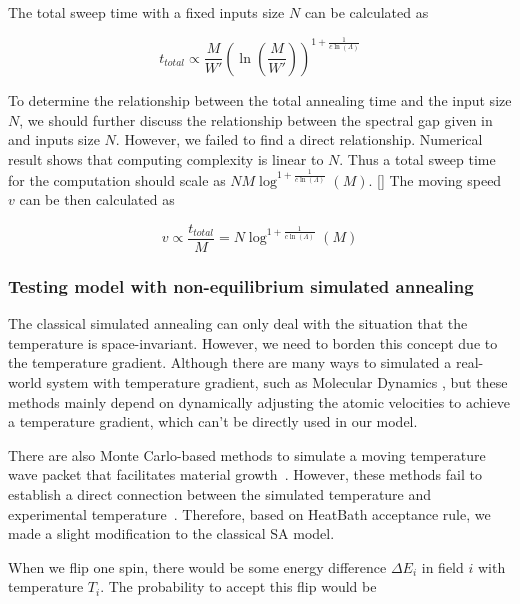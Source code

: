 \documentclass[twocolumn,superscriptaddress,english,showpacs,longbibliography]{revtex4-2}
\newcommand{\ym}[1]{[{\color{red}{YM: #1}}]}
\begin{document}
The total sweep time with a fixed inputs size $N$ can be calculated as 

\begin{equation}
    \label{eq:total-annealing-time}
    t_{total} \propto \frac{M}{W'}(\ln(\frac{M}{W'}))^{1+ \frac{1}{c\ln(\Lambda)}}
\end{equation}

To determine the relationship between the total annealing time and the input size $N$, we should
further discuss the relationship between the spectral gap given in   and inputs size $N$.
However, we failed to find a direct relationship.
Numerical result shows that computing complexity is linear to $N$. Thus a total sweep time
for the computation should scale as $NM\log^{1 + \frac{1}{c\ln(\Lambda)}}(M)$.
\ym{Please help me to think about how to evaluate the time complexity while $N$ increases.} 
The moving speed $v$ can be then calculated as

\begin{equation}
    \label{eq:moving-speed}
    v \propto \frac{t_{total}}{M} = N\log^{1 + \frac{1}{c\ln(\Lambda)}}(M)
\end{equation}

\subsubsection{Testing model with non-equilibrium simulated
annealing}\label{some-details-about-non-equilibrium-simulated-annealing}

The classical simulated annealing can only deal with the situation that
the temperature is space-invariant. However, we need to borden this concept
due to the temperature gradient. Although there are many ways to
simulated a real-world system with temperature gradient, such as
Molecular Dynamics \cite{Bai2015, Deng2006}, but
these methods mainly depend on dynamically adjusting the atomic
velocities to achieve a temperature gradient, which can't be directly
used in our model.

There are also Monte Carlo-based methods to simulate a moving
temperature wave packet that facilitates material growth~\cite{Godfrey1995, Tan2017}.
However, these methods fail to establish a direct connection between the simulated temperature and experimental
temperature~\cite{Zollner2014}.
Therefore, based on HeatBath acceptance rule, we made a slight modification to the classical SA model.

When we flip one spin, there would be some energy difference
$\Delta E_{i}$ in field $i$ with temperature $T_i$. The
probability to accept this flip would be
\end{document}
